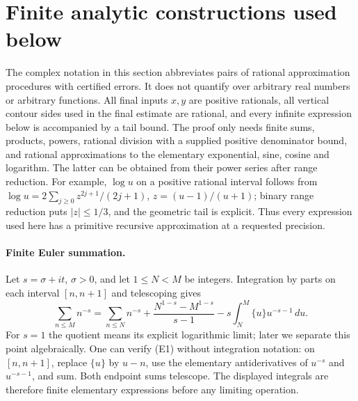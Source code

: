 \section{Finite analytic constructions used below}
The complex notation in this section abbreviates pairs of rational
approximation procedures with certified errors. It does not quantify over
arbitrary real numbers or arbitrary functions. All final inputs $x,y$ are
positive rationals, all vertical contour sides used in the final estimate
are rational, and every infinite expression below is accompanied by a
tail bound. The proof only needs finite sums, products, powers, rational
division with a supplied positive denominator bound, and rational
approximations to the elementary exponential, sine, cosine and logarithm.
The latter can be obtained from their power series after range reduction.
For example, $\log u$ on a positive rational interval follows from
$\log u=2\sum_{j\ge0}z^{2j+1}/(2j+1)$, $z=(u-1)/(u+1)$;
binary range reduction puts $|z|\le1/3$, and the geometric tail is
explicit. Thus every expression used here has a primitive recursive
approximation at a requested precision.

\paragraph{Finite Euler summation.}
Let $s=\sigma+it$, $\sigma>0$, and let $1\le N<M$ be integers.
Integration by parts on each interval $[n,n+1]$ and telescoping gives
\[
 \sum_{n\le M}n^{-s}=\sum_{n\le N}n^{-s}
 +\frac{N^{1-s}-M^{1-s}}{s-1}
 -s\int_N^M\{u\}u^{-s-1}\,du.                              \tag{E1}
\]
For $s=1$ the quotient means its explicit logarithmic limit; later we
separate this point algebraically. One can verify (E1) without integration
notation: on $[n,n+1]$, replace $\{u\}$ by $u-n$, use the elementary
antiderivatives of $u^{-s}$ and $u^{-s-1}$, and sum. Both endpoint sums
telescope. The displayed integrals are therefore finite elementary
expressions before any limiting operation.

